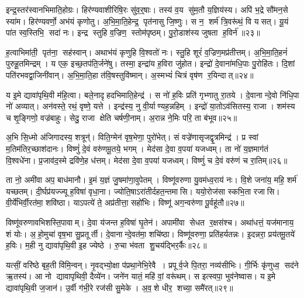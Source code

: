 इन्द्र॒स्तर॑स्वानभिमाति॒होग्रः।
हिर॑ण्यवाशीरिषि॒रः सु॑व॒र्॒षाः।
तस्य॑ व॒य सु॑म॒तौ य॒ज्ञिय॑स्य।
अपि॑ भ॒द्रे सौ॑मन॒से स्या॑म।
हिर॑ण्यवर्णो॒ अभ॑यं कृणोतु।
अ॒भि॒मा॒ति॒हेन्द्र॒ पृत॑नासु जि॒ष्णुः।
स न॒ शर्म॑ त्रि॒वरू॑थं॒ वि यसत्।
यू॒यं पा॑त स्व॒स्तिभि॒ सदा॑ नः।
इन्द्र स्तुहि व॒ज्रिण॒ स्तोम॑पृष्ठम्।
पु॒रो॒डाश॑स्य जुषता ह॒विर्न॑॥२३॥

ह॒त्वाभिमा॑ती॒ पृत॑ना॒ सह॑स्वान्।
अथाभ॑यं कृणुहि वि॒श्वतो॑ नः।
स्तु॒हि शूरं॑ व॒ज्रिण॒मप्र॑तीत्तम्।
अ॒भि॒मा॒ति॒हनं॑ पुरुहू॒तमिन्द्रम्।
य एक॒ इच्छ॒तप॑ति॒र्जने॑षु।
तस्मा॒ इन्द्रा॑य ह॒विरा जु॑होत।
इन्द्रो॑ दे॒वाना॑मधि॒पाः पु॒रोहि॑तः।
दि॒शां पति॑रभवद्वा॒जिनी॑वान्।
अ॒भि॒मा॒ति॒हा त॑वि॒षस्तुवि॑ष्मान्।
अ॒स्मभ्यं॑ चित्रं वृष॑ण र॒यिन्दात्॥२४॥

य इ॒मे द्यावा॑पृथि॒वी म॑हि॒त्वा।
बले॒नादृहदभिमाति॒हेन्द्र॑।
स नो॑ ह॒विः प्रति॑ गृभ्णातु रा॒तये।
दे॒वानान्दे॒वो नि॑धि॒पा नो॑ अव्यात्।
अन॑वस्ते॒ रथं॒ वृष्णे॒ यत्ते।
इन्द्र॑स्य॒ नु वी॒र्याण्यह॒न्नहिम्।
इन्द्रो॑ या॒तोऽव॑सितस्य॒ राजा।
शम॑स्य च शृ॒ङ्गिणो॒ वज्र॑बाहुः।
सेदु॒ राजा क्षेति चर्\mbox{}षणी॒नाम्।
अ॒रान्न ने॒मिः परि॒ ता ब॑भूव॥२५॥

अ॒भि सि॒ध्मो अ॑जिगादस्य॒ शत्रून्॑।
विति॒ग्मेन॑ वृष॒भेणा॒ पुरो॑भेत्।
सं वज्रे॑णासृजद्वृ॒त्रमिन्द्र॑।
प्र स्वां म॒तिम॑तिर॒च्छाश॑दानः।
विष्णुं॑ दे॒वं वरु॑णमू॒तये॒ भगम्।
मेद॑सा दे॒वा व॒पया॑ यजध्वम्।
ता नो॑ य॒ज्ञमाग॑तं वि॒श्वधे॑ना।
प्र॒जाव॑द॒स्मे द्रवि॑णे॒ह ध॑त्तम्।
मेद॑सा दे॒वा व॒पया॑ यजध्वम्।
विष्णुं॑ च दे॒वं वरु॑णं च रा॒तिम्॥२६॥

ता नो॒ अमी॑वा अप॒ बाध॑मानौ।
इ॒मं य॒ज्ञं जु॒षमा॑णा॒वुपेतम्।
विष्णू॑वरुणा यु॒वम॑ध्व॒राय॑ नः।
वि॒शे जना॑य॒ महि॒ शर्म॑ यच्छतम्।
दी॒र्घप्र॑यज्ज्यू ह॒विषा॑ वृधा॒ना।
ज्योति॒षाऽरा॑तीर्दहत॒न्तमासि।
ययो॒रोज॑सा स्कभि॒ता रजासि।
वी॒र्ये॑भिर्वी॒रत॑मा॒ शवि॑ष्ठा।
याऽपत्ये॑ ते॒ अप्र॑तीत्ता॒ सहो॑भिः।
विष्णू॑ अग॒न्वरु॑णा पू॒र्वहू॑तौ॥२७॥

विष्णू॑वरुणावभिशस्ति॒पावाम्।
दे॒वा य॑जन्त ह॒विषा॑ घृ॒तेन॑।
अपामी॑वा सेधत र॒क्षस॑श्च।
अथा॑धत्तं॒ यज॑मानाय॒ शं योः।
अ॒हो॒मुचा॑ वृष॒भा सु॒प्रतूर्ती।
दे॒वानान्दे॒वत॑मा॒ शचि॑ष्ठा।
विष्णू॑वरुणा॒ प्रति॑हर्यतन्नः।
इ॒दन्नरा॒ प्रय॑तमू॒तये॑ ह॒विः।
म॒ही नु द्यावा॑पृथि॒वी इ॒ह ज्येष्ठे।
रु॒चा भ॑वता शु॒चय॑द्भिर॒र्कैः॥२८॥

यत्सीं॒ वरि॑ष्ठे बृह॒ती वि॑मि॒न्वन्।
नृ॒वद्भ्यो॒क्षा प॑प्रथा॒नेभि॒रेवै।
प्रपूर्व॒जे पि॒तरा॒ नव्य॑सीभिः।
गी॒र्भिः कृ॑णुध्व॒ सद॑ने ऋ॒तस्य॑।
आ नो द्यावापृथिवी॒ दैव्ये॑न।
जने॑न यातं॒ महि॑ वां॒ वरू॑थम्।
स इत्स्वपा॒ भुव॑नेष्वास।
य इ॒मे द्यावा॑पृथि॒वी ज॒जान॑।
उ॒र्वी ग॑भी॒रे रज॑सी सु॒मेके।
अ॒व॒शे धीर॒ शच्या॒ समै॑रत्॥२९॥

